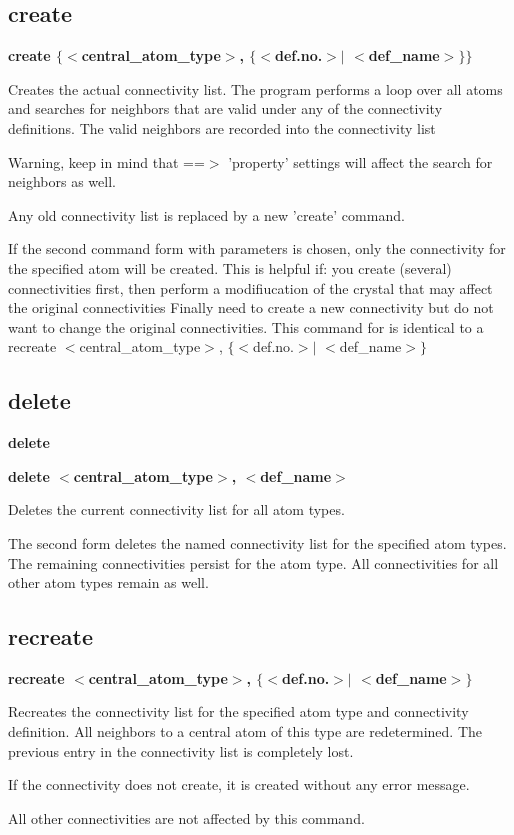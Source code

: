 \subsection*{create}
{\bf create $ \{$$ <$central\_atom\_type$> $, $ \{$$ <$def.no.$> $$| $ $ <$def\_name$> $$\} $$\} $ \par }
\par
\vspace{3pt}
Creates the actual connectivity list. 
The program performs a loop over all atoms and searches for neighbors 
that are valid under any of the connectivity definitions. The valid 
neighbors are recorded into the connectivity list 
\par
Warning, keep in mind that ==$> $ 'property' settings will affect the 
search for neighbors as well. 
\par
Any old connectivity list is replaced by a new 'create' command. 
\par
If the second command form with parameters is chosen, only the 
connectivity for the specified atom will be created. 
This is helpful if: 
  you create (several) connectivities first, 
  then perform a modifiucation of the crystal that may affect the 
  original connectivities 
  Finally need to create a new connectivity but do not want to 
  change the original connectivities. 
This command for  is identical to a 
  recreate $ <$central\_atom\_type$> $, $ \{$$ <$def.no.$> $$| $ $ <$def\_name$> $$\} $ 
\subsection*{delete}
{\bf delete \par }
{\bf delete $ <$central\_atom\_type$> $, $ <$def\_name$> $ \par }
\par
\vspace{3pt}
Deletes the current connectivity list for all atom types. 
\par
The second form deletes the named connectivity list for the 
specified atom types. The remaining connectivities persist 
for the atom type. All connectivities for all other 
atom types remain as well. 
\subsection*{recreate}
{\bf recreate $ <$central\_atom\_type$> $, $ \{$$ <$def.no.$> $$| $ $ <$def\_name$> $$\} $ \par }
\par
\vspace{3pt}
Recreates the connectivity list for the specified atom type and 
connectivity definition. 
All neighbors to a central atom of this type are redetermined. 
The previous entry in the connectivity list is completely lost. 
\par
If the connectivity does not create, it is created without 
any error message. 
\par
All other connectivities are not affected by this command. 
